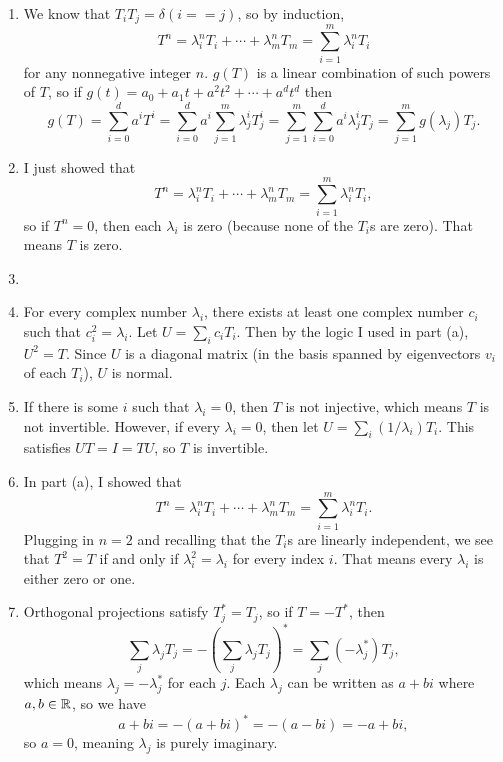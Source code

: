 \documentclass{article}
\begin{document}
\bigskip
\par
\begin{prob}
\end{prob}
\begin{enumerate}[label=(\alph*)]
    \item We know that $T_i T_j = \delta(i == j)$, so by induction,
        \[ T^n = \lambda_i^n T_i + \cdots + \lambda_m^n T_m = \sum_{i=1}^m \lambda_i^n T_i \]
        for any nonnegative integer $n$. $g(T)$ is a linear combination of such powers of $T$, so if $g(t) = a_0 + a_1 t + a^2 t^2 + \cdots + a^d t^d$ then
        \[ g(T) = \sum_{i=0}^d a^i T^i = \sum_{i=0}^d a^i \sum_{j=1}^m \lambda_j^i T_j^i = \sum_{j=1}^m \sum_{i=0}^d a^i \lambda_j^i T_j = \sum_{j=1}^m g(\lambda_j) T_j. \]
    \item I just showed that
        \[ T^n = \lambda_i^n T_i + \cdots + \lambda_m^n T_m = \sum_{i=1}^m \lambda_i^n T_i, \]
        so if $T^n=0$, then each $\lambda_i$ is zero (because none of the $T_i$s are zero). That means $T$ is zero.
    \item
    \item For every complex number $\lambda_i$, there exists at least one complex number $c_i$ such that $c_i^2 = \lambda_i$. Let $U = \sum_i c_i T_i$. Then by the logic I used in part (a), $U^2 = T$. Since $U$ is a diagonal matrix (in the basis spanned by eigenvectors $v_i$ of each $T_i$), $U$ is normal.
    \item If there is some $i$ such that $\lambda_i = 0$, then $T$ is not injective, which means $T$ is not invertible. However, if every $\lambda_i = 0$, then let $U = \sum_i (1/\lambda_i) T_i$. This satisfies $UT=I=TU$, so $T$ is invertible.
    \item In part (a), I showed that
        \[ T^n = \lambda_i^n T_i + \cdots + \lambda_m^n T_m = \sum_{i=1}^m \lambda_i^n T_i. \]
        Plugging in $n=2$ and recalling that the $T_i$s are linearly independent, we see that $T^2=T$ if and only if $\lambda_i^2=\lambda_i$ for every index $i$. That means every $\lambda_i$ is either zero or one.
    \item Orthogonal projections satisfy $T_j^*=T_j$, so if $T=-T^*$, then
        \[ \sum_j \lambda_j T_j = - \left( \sum_j \lambda_j T_j \right)^* = \sum_j \left( -\lambda_j^* \right) T_j, \]
        which means $\lambda_j = -\lambda_j^*$ for each $j$. Each $\lambda_j$ can be written as $a+bi$ where $a,b \in \mathbb{R}$, so we have
        \[ a+bi = - (a+bi)^* = -(a-bi)=-a+bi, \]
        so $a=0$, meaning $\lambda_j$ is purely imaginary.
\end{enumerate}
\end{document}
